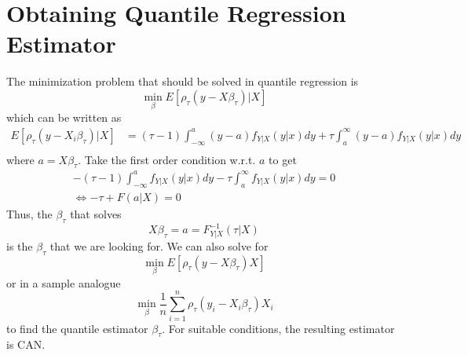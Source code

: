 \section{Obtaining Quantile Regression Estimator}
The minimization problem that should be solved in quantile regression is
\[
\min_\beta E[ \rho_\tau(y-X\beta_\tau)|X]
\]
which can be written as
\begin{align*}
E[ \rho_\tau(y-X_i\beta_\tau)|X] &= (\tau-1)\int_{-\infty}^{a} (y-a)f_{Y|X}(y|x)dy+ \tau\int_{a}^\infty(y-a) f_{Y|X}(y|x)dy\\
\end{align*}
where $a=X\beta_\tau$. Take the first order condition w.r.t. $a$ to get
\begin{gather*}
-(\tau-1)\int_{-\infty}^a f_{Y|X}(y|x)dy - \tau\int_a^\infty f_{Y|X}(y|x)dy=0\\
\iff -\tau + F(a|X)=0
\end{gather*}
Thus, the $\beta_\tau$ that solves
\[
X\beta_\tau=a=F^{-1}_{Y|X}(\tau|X)
\]
is the $\beta_\tau$ that we are looking for. We can also solve for
\[
\min_\beta E[\rho_\tau(y-X\beta_\tau)X]
\] 
or in a sample analogue
\[
\min_\beta \frac{1}{n}\sum_{i=1}^n \rho_\tau(y_i-X_i\beta_\tau)X_i
\]
to find the quantile estimator $\beta_\tau$. For suitable conditions, the resulting estimator is CAN. 
